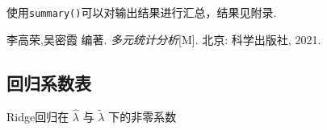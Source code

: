 \documentclass[12pt, a4paper, oneside]{ctexart}
\begin{document}
	使用\texttt{summary()}可以对输出结果进行汇总，结果见附录.
	\newpage
	
	\begin{thebibliography}{99}
		李高荣,吴密霞 编著. \emph{多元统计分析}[M]. 北京: 科学出版社, 2021.
	\end{thebibliography}
	
	\newpage
	
	\begin{appendices}
		\renewcommand{\thesection}{\Alph{section}}
		\section{回归系数表}
		\begin{table}[htbp]
			\centering
			\caption{Ridge回归在 $\hat{\lambda}$ 与 $\tilde{\lambda}$ 下的非零系数}
			\vspace{1em}
			

\end{table}
\end{appendices}
\end{document}
